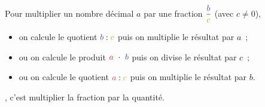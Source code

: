 \vfill

\begin{aconnaitre}
Pour multiplier un nombre décimal \textcolor{B2}{$a$} par une fraction $\dfrac{\textcolor{PartieGeometrie}{b}}{\textcolor{H1}{c}}$ (avec $c \neq 0$),
\begin{itemize}
 \item on calcule le quotient $\textcolor{PartieGeometrie}{b} : \textcolor{H1}{c}$ puis on multiplie le résultat par \textcolor{B2}{$a$} ;
 \item ou on calcule le produit $\textcolor{B2}{a} \cdot \textcolor{PartieGeometrie}{b}$ puis on divise le résultat par \textcolor{H1}{$c$} ;
 \item ou on calcule le quotient $\textcolor{B2}{a} : \textcolor{H1}{c}$ puis on multiplie le résultat par \textcolor{PartieGeometrie}{$b$}.
 \end{itemize}
\end{aconnaitre}


\newpage


\begin{aconnaitre}
, c'est multiplier la fraction par la quantité.
\end{aconnaitre}


